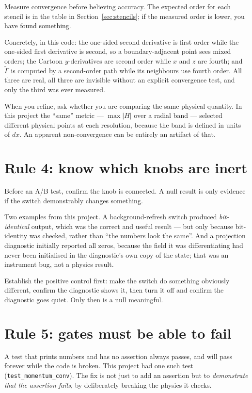 \documentclass[11pt,openany]{book}
\newcommand{\Gt}{\tilde{\Gamma}}
\begin{document}
Measure convergence before believing accuracy. The expected order for each
stencil is in the table in Section~\ref{sec:stencils}; if the measured order is
lower, you have found something.

Concretely, in this code: the one-sided second derivative is first order while
the one-sided first derivative is second, so a boundary-adjacent point sees
mixed orders; the Cartoon $y$-derivatives are second order while $x$ and $z$
are fourth; and $\Gt$ is computed by a second-order path while its
neighbours use fourth order. All three are real, all three are invisible
without an explicit convergence test, and only the third was ever measured.

\gotcha
When you refine, ask whether you are comparing the same physical quantity. In
this project the ``same'' metric --- $\max|H|$ over a radial band --- selected
different physical points at each resolution, because the band is defined in
units of $dx$. An apparent non-convergence can be entirely an artifact of that.

\section{Rule 4: know which knobs are inert}

Before an A/B test, confirm the knob is connected. A null result is only
evidence if the switch demonstrably changes something.

Two examples from this project. A background-refresh switch produced
\emph{bit-identical} output, which was the correct and useful result --- but
only because bit-identity was checked, rather than ``the numbers look the
same''. And a projection diagnostic initially reported all zeros, because the
field it was differentiating had never been initialised in the diagnostic's
own copy of the state; that was an instrument bug, not a physics result.

\gotcha
Establish the positive control first: make the switch do something obviously
different, confirm the diagnostic shows it, then turn it off and confirm the
diagnostic goes quiet. Only then is a null meaningful.

\section{Rule 5: gates must be able to fail}

A test that prints numbers and has no assertion always passes, and will pass
forever while the code is broken. This project had one such test
(\texttt{test\_momentum\_conv}). The fix is not just to add an assertion but to
\emph{demonstrate that the assertion fails}, by deliberately breaking the physics it
checks.
\end{document}
